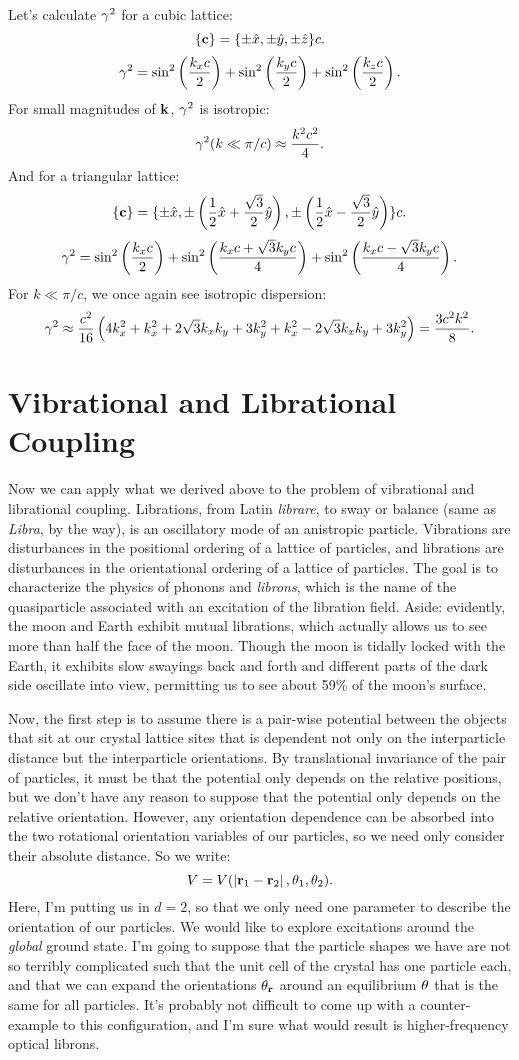\documentclass[12pt]{article}
\begin{document}
Let's calculate $\gamma^2$ for a cubic lattice:
\[ \{\mathbf{c}\} = \{\pm \hat x, \pm \hat y,\pm \hat z\} c.\]
\[ \gamma^2 = \sin^2\left(\frac{k_xc}{2}\right) + \sin^2\left(\frac{k_yc}{2}\right)+\sin^2\left(\frac{k_zc}{2}\right).\]
For small magnitudes of $\mathbf{k}$, $\gamma^2$ is isotropic:
\[ \gamma^2(k \ll \pi/c) \approx \frac{k^2c^2}{4}.\]
And for a triangular lattice:
\[ \{\mathbf{c}\} = \{\pm \hat x,\pm \left(\frac{1}{2}\hat x + \frac{\sqrt 3}{2} \hat y\right),\pm \left( \frac{1}{2} \hat x - \frac{\sqrt 3}{2} \hat y\right)\}c.\]
\[ \gamma^2 = \sin^2\left(\frac{k_x c}{2}\right) + \sin^2\left(\frac{k_x c + \sqrt 3 k_y c}{4}\right) + \sin^2 \left(\frac{ k_x c - \sqrt 3 k_y c}{4}\right).\]
For $k \ll \pi/c$, we once again see isotropic dispersion:
\[ \gamma^2 \approx \frac{c^2}{16}\left(4k_x^2 + k_x^2 + 2\sqrt 3 k_x k_y + 3 k_y^2 + k_x^2 - 2\sqrt 3 k_x k_y + 3 k_y^2\right) = \frac{3 c^2 k^2}{8}.\]

\section{Vibrational and Librational Coupling}
Now we can apply what we derived above to the problem of vibrational and librational coupling. Librations, from Latin \emph{librare}, to sway  or balance (same as \emph{Libra}, by the way), is an oscillatory mode of an anistropic particle. Vibrations are disturbances in the positional ordering of a lattice of particles, and librations are disturbances in the orientational ordering of a lattice of particles. The goal is to characterize the physics of phonons and \emph{librons}, which is the name of the quasiparticle associated with an excitation of the libration field. Aside: evidently, the moon and Earth exhibit mutual librations, which actually allows us to see more than half the face of the moon. Though the moon is tidally locked with the Earth, it exhibits slow swayings back and forth and different parts of the dark side oscillate into view, permitting us to see about 59\% of the moon's surface. 


Now, the first step is to assume there is a pair-wise potential between the objects that sit at our crystal lattice sites that is dependent not only on the interparticle distance but the interparticle orientations. By translational invariance of the pair of particles, it must be that the potential only depends on the relative positions, but we don't have any reason to suppose that the potential only depends on the relative orientation. However, any orientation dependence can be absorbed into the two rotational orientation variables of our particles, so we need only consider their absolute distance. So we write:
\[ V = V(\left | \mathbf{r}_1 - \mathbf{r}_2 \right |,\theta_1,\theta_2).\]
Here, I'm putting us in $d=2$, so that we only need one parameter to describe the orientation of our particles. We would like to explore excitations around the \emph{global} ground state. I'm going to suppose that the particle shapes we have are not so terribly complicated such that the unit cell of the crystal has one particle each, and that we can expand the orientations $\theta_{\mathbf{r}}$ around an equilibrium $\theta$ that is the same for all particles. It's probably not difficult to come up with a counter-example to this configuration, and I'm sure what would result is higher-frequency optical librons.
\end{document}

